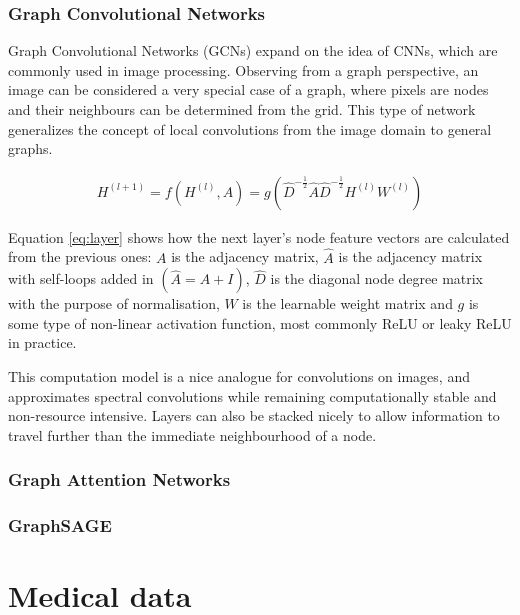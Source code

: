 	\subsubsection{Graph Convolutional Networks}
	
	Graph Convolutional Networks (GCNs) expand on the idea of CNNs, which are commonly used in image processing. Observing from a graph perspective, an image can be considered a very special case of a graph, where pixels are nodes and their neighbours can be determined from the grid. This type of network generalizes the concept of local convolutions from the image domain to general graphs.
	
	\begin{align}
		H^{(l+1)} = f\left(H^{(l)}, A\right) = g\left(\hat{D}^{- \frac{1}{2}} \hat{A} \hat{D}^{- \frac{1}{2}} H^{(l)} W^{(l)}\right)
		\label{eq:layer}
	\end{align}
	
	Equation \ref{eq:layer} shows how the next layer's node feature vectors are calculated from the previous ones: $A$ is the adjacency matrix, $\hat{A}$ is the adjacency matrix with self-loops added in $(\hat{A} = A + I)$, $\hat{D}$ is the diagonal node degree matrix with the purpose of normalisation, $W$ is the learnable weight matrix and $g$ is some type of non-linear activation function, most commonly ReLU or leaky ReLU in practice.
	
	This computation model is a nice analogue for convolutions on images, and approximates spectral convolutions while remaining computationally stable and non-resource intensive. Layers can also be stacked nicely to allow information to travel further than the immediate neighbourhood of a node.
	
	\subsubsection{Graph Attention Networks}
	
	
	
	\subsubsection{GraphSAGE}
	
	
\section{Medical data}

